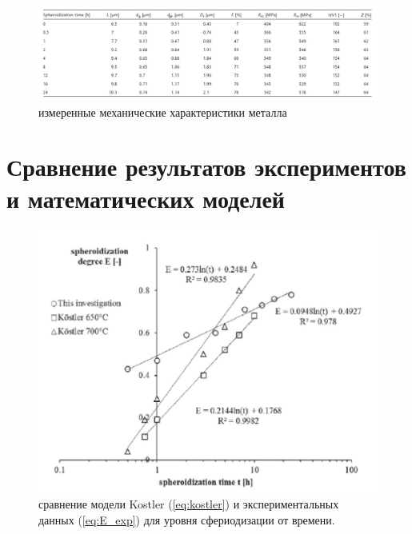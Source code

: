 \documentclass[a4paper, 14pt]{article}
\begin{document}
	\begin{figure}[h!]
	\centering
	\includegraphics[scale=0.4]{images/table}
	\caption{измеренные механические характеристики металла}
	\end{figure}

	\newpage
	
	\FloatBarrier
	
	\section{Сравнение результатов экспериментов и  математических моделей}
	
		\begin{figure}[h!]
		\centering
		\includegraphics[scale=0.4]{images/kostler}
		\caption{сравнение модели Kostler (\ref{eq:kostler}) и экспериментальных данных (\ref{eq:E_exp}) для уровня сфериодизации от времени.}
	\end{figure}
\end{document}
